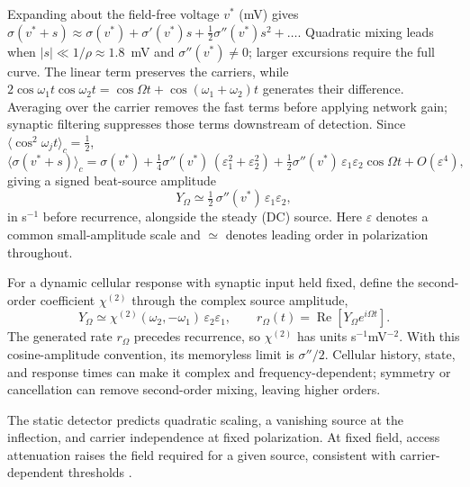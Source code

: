 \documentclass[11pt,a4paper]{article}
\newcommand{\Sig}{\sigma}
\newcommand{\half}{\tfrac{1}{2}}
\begin{document}
Expanding about the field-free voltage $v^*$ (mV)
\cite{ruffini2025ham} gives
$\Sig(v^*+s)\approx\Sig(v^*)+\Sig'(v^*)s+\half\Sig''(v^*)s^2+\dots$.
Quadratic mixing leads when $|s|\ll1/\rho\approx1.8$~mV and
$\Sig''(v^*)\ne0$; larger excursions require the full curve.
The linear term preserves the carriers, while
$2\cos\omega_1t\cos\omega_2t=\cos\Omega t+\cos(\omega_1+\omega_2)t$
generates their difference. Averaging over the carrier removes the fast terms
before applying network gain; synaptic filtering suppresses those terms
downstream of detection. Since $\langle\cos^2\omega_jt\rangle_c=\half$,
\begin{equation}
\big\langle\Sig(v^*+s)\big\rangle_c
=\Sig(v^*)+\tfrac14\Sig''(v^*)\,(\varepsilon_1^2+\varepsilon_2^2)
+\tfrac12\Sig''(v^*)\,\varepsilon_1\varepsilon_2\cos\Omega t+O(\varepsilon^4),
\label{eq:taylor}
\end{equation}
giving a signed beat-source amplitude
\begin{equation}
Y_\Omega\simeq\half\,\Sig''(v^*)\,\varepsilon_1\varepsilon_2 ,
\label{eq:demod}
\end{equation}
in s$^{-1}$ before recurrence, alongside the steady (DC) source.
Here $\varepsilon$ denotes a common small-amplitude scale and $\simeq$
denotes leading order in polarization throughout.

For a dynamic cellular response with synaptic input held fixed, define
the second-order coefficient $\chi^{(2)}$ through the complex source amplitude,
\begin{equation}
Y_\Omega\simeq\chi^{(2)}(\omega_2,-\omega_1)\,
\varepsilon_2\varepsilon_1,\qquad
r_\Omega(t)=\operatorname{Re}\!\left[Y_\Omega e^{i\Omega t}\right].
\label{eq:chi2}
\end{equation}
The generated rate $r_\Omega$ precedes recurrence, so $\chi^{(2)}$ has units
s$^{-1}$mV$^{-2}$. With this cosine-amplitude convention, its memoryless
limit is $\Sig''/2$. Cellular history, state, and response times can make
it complex and frequency-dependent; symmetry or cancellation can remove
second-order mixing, leaving higher orders.

The static detector predicts quadratic scaling, a vanishing source at the
inflection, and carrier independence at fixed polarization. At fixed field,
access attenuation raises the field required for a given source, consistent
with carrier-dependent thresholds \cite{opancar2025,peripheral2023}.
\end{document}

